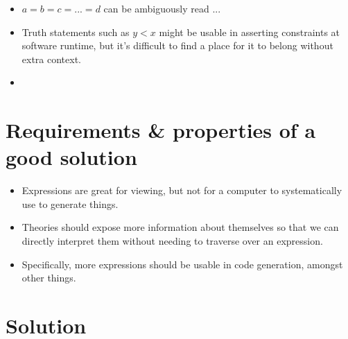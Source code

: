 \begin{itemize}
\begin{itemize}
		      \item \(a = b = c = ... = d\) can be ambiguously read ...

		      \item Truth statements such as \(y < x\) might be usable in
		            asserting constraints at software runtime, but it's
		            difficult to find a place for it to belong without extra
		            context.

		      \item {}

	      \end{itemize}

\end{itemize}

\section{Requirements \& properties of a good solution}

\begin{itemize}

	\item Expressions are great for viewing, but not for a computer to
	      systematically use to generate things.

	\item Theories should expose more information about themselves so that
	      we can directly interpret them without needing to traverse over
	      an expression.

	\item Specifically, more expressions should be usable in code generation,
	      amongst other things.

\end{itemize}

\section{Solution}

